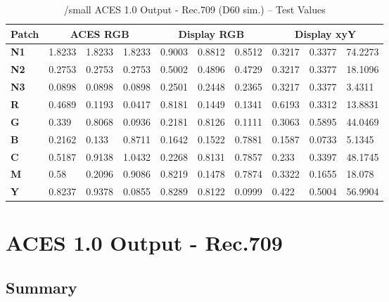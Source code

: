 \begin{table}[ht!]
    \centering
    \begin{tabular}{|l|l|l|l|l|l|l|l|l|l|}
        \hline
        \multicolumn{1}{|c|}{\textbf{Patch}} & \multicolumn{3}{c|}{\textbf{ACES RGB}} & \multicolumn{3}{c|}{\textbf{Display RGB}} & \multicolumn{3}{c|}{\textbf{Display xyY}} \\ \hline
        \textbf{N1} & 1.8233 & 1.8233 & 1.8233 & 0.9003 & 0.8812 & 0.8512 & 0.3217 & 0.3377 & 74.2273 \\
        \textbf{N2} & 0.2753 & 0.2753 & 0.2753 & 0.5002 & 0.4896 & 0.4729 & 0.3217 & 0.3377 & 18.1096 \\
        \textbf{N3} & 0.0898 & 0.0898 & 0.0898 & 0.2501 & 0.2448 & 0.2365 & 0.3217 & 0.3377 & 3.4311  \\
        \textbf{R}  & 0.4689 & 0.1193 & 0.0417 & 0.8181 & 0.1449 & 0.1341 & 0.6193 & 0.3312 & 13.8831 \\
        \textbf{G}  & 0.339  & 0.8068 & 0.0936 & 0.2181 & 0.8126 & 0.1111 & 0.3063 & 0.5895 & 44.0469 \\
        \textbf{B}  & 0.2162 & 0.133  & 0.8711 & 0.1642 & 0.1522 & 0.7881 & 0.1587 & 0.0733 & 5.1345  \\
        \textbf{C}  & 0.5187 & 0.9138 & 1.0432 & 0.2268 & 0.8131 & 0.7857 & 0.233  & 0.3397 & 48.1745 \\
        \textbf{M}  & 0.58   & 0.2096 & 0.9086 & 0.8219 & 0.1478 & 0.7874 & 0.3322 & 0.1655 & 18.078  \\
        \textbf{Y}  & 0.8237 & 0.9378 & 0.0855 & 0.8289 & 0.8122 & 0.0999 & 0.422  & 0.5004 & 56.9904 \\
        \hline
        \end{tabular}
        \caption[ACES 1.0 Output - Rec.709 (D60 sim.) -- Test Values]{/small ACES 1.0 Output - Rec.709 (D60 sim.) -- Test Values}
        \label{tab:testValues-rec709d60sim}
\end{table}

\clearpage
\section{ACES 1.0 Output - Rec.709}
\label{sec:odt-details-rec709}

\subsection{Summary}
\label{subsec:summary-rec709}

